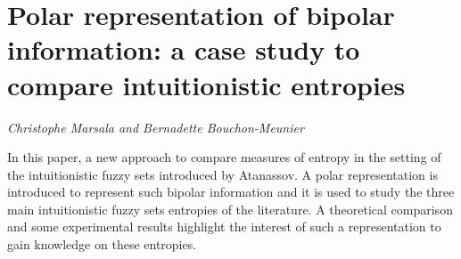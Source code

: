 \documentclass[../booklet.tex]{subfiles}
\begin{document}
\section[Polar representation of bipolar information: a case study to compare intuitionistic entropies. {\it Christophe Marsala and Bernadette Bouchon-Meunier}]{Polar representation of bipolar information: a case study to compare intuitionistic entropies}
 

\begin{center}
  {\it Christophe Marsala and Bernadette Bouchon-Meunier}
\end{center}

\vskip 0.8cm


  In this paper, a new approach to compare measures of entropy in the setting of the
  intuitionistic fuzzy sets introduced by Ata\-nas\-sov.  A polar representation is
  introduced to represent such bipolar information and it is used to study the three main
  intuitionistic fuzzy sets entropies of the literature. A theoretical comparison and some
  experimental results highlight the interest of such a representation to gain knowledge
  on these entropies.

\end{document}
